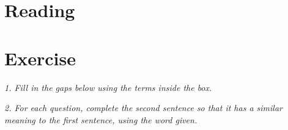 \documentclass{article}
\begin{document}
\newpage
\section{Reading}

%
%
%
%
%
%
%
%
%
%
%
%
%
%
%
%
%
%
%
%



\newpage
\section{Exercise}

\noindent \textit{1. Fill in the gaps below using the terms inside the box.}

%
%
%
%
%
%
%
%
%
%
%
%
%
%
%
%
%
%
%
%



\noindent \textit{2. For each question, complete the second sentence so that it has a similar meaning to the first sentence, using the word given.}

%
%
%
%
%
%
%
%
%
%
%
%
%
%
%
%
%
%
%
%
\end{document}
